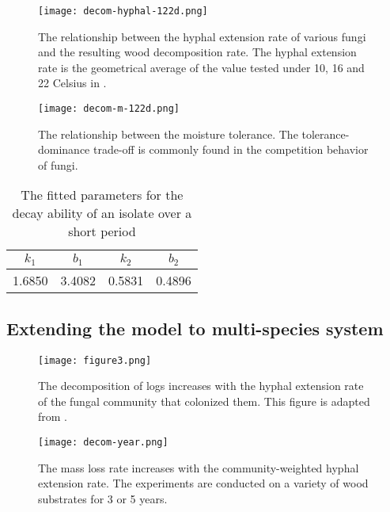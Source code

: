 \begin{figure}
    \centering
    \begin{minipage}[t]{0.48\textwidth}
        \centering
        \texttt{[image: decom-hyphal-122d.png]}
        \caption{The relationship between the hyphal extension rate of various fungi and the resulting wood decomposition rate. The hyphal extension rate is the geometrical average of the value tested under 10, 16 and 22 Celsius in \cite{Lustenshouwer}.}
        \label{fig:decom-hyphal-122d}
    \end{minipage}
    \begin{minipage}[t]{0.48\textwidth}
        \centering
        \texttt{[image: decom-m-122d.png]}
        \caption{The  relationship  between  the  moisture tolerance. The tolerance-dominance trade-off is commonly found in the competition behavior of fungi. \cite{Maynard-data}}
        \label{fig:decom-m-122d}
    \end{minipage}
\end{figure}


\begin{table}
    \caption{The fitted parameters for the decay ability of an isolate over a short period}
    \centering
    \begin{tabular}{cccc}
        \toprule
        $k_1$  & $b_1$  & $k_2$  & $b_2$  \\
        \midrule
        1.6850 & 3.4082 & 0.5831 & 0.4896 \\
        \bottomrule
    \end{tabular}\label{tb:para-122d}
\end{table}

\subsection{Extending the model to multi-species system}

\begin{figure}
    \centering
    \begin{minipage}[t]{0.48\textwidth}
        \centering
        \texttt{[image: figure3.png]}
        \caption{The decomposition of logs increases with the hyphal extension rate of the fungal community that colonized them. This figure is adapted from \cite{Lustenshouwer}.}
        \label{fig:community}
    \end{minipage}
    \begin{minipage}[t]{0.48\textwidth}
        \centering
        \texttt{[image: decom-year.png]}
        \caption{The mass loss rate increases with the community-weighted hyphal extension rate. The experiments are conducted on a variety of wood substrates for 3 or 5 years.}
        \label{fig:decom-year}
    \end{minipage}
\end{figure}

